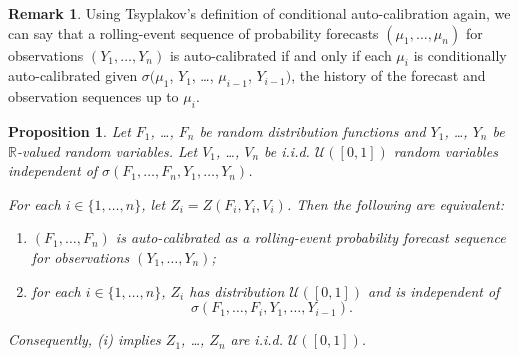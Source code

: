 \documentclass[aap]{imsart}
\theoremstyle{plain}
\newtheorem{proposition}[theorem]{Proposition}
\theoremstyle{definition}
\newtheorem*{remark}{Remark}
\begin{document}
\begin{remark}
Using Tsyplakov's definition of conditional auto-calibration again, we can say that a rolling-event sequence of probability forecasts $(\mu_1, \ldots, \mu_n)$ for observations $(Y_1, \ldots, Y_n)$ is auto-calibrated if and only if each $\mu_i$ is conditionally auto-calibrated given $\sigma(\mu_1$, $Y_1$, \ldots, $\mu_{i-1}$, $Y_{i-1})$, the history of the forecast and observation sequences up to $\mu_i$.
\end{remark}

\begin{proposition}\label{PIT_values}
  Let $F_1$, \ldots, $F_n$ be random distribution functions and $Y_1$, \ldots, $Y_n$ be $\mathbb{R}$-valued random variables. Let $V_1$, \ldots, $V_n$ be i.i.d. $\mathcal{U}([0,1])$ random variables independent of $\sigma(F_1, \ldots, F_n, Y_1, \ldots, Y_n)$.

  For each $i \in \{1, \ldots, n\}$, let $Z_i = Z(F_i, Y_i, V_i)$. Then the following are equivalent:
\begin{enumerate}[label=(\roman*)]
  \item $(F_1, \ldots, F_n)$ is auto-calibrated as a rolling-event probability forecast sequence for observations $(Y_1, \ldots, Y_n)$;
  \item for each $i \in \{1, \ldots, n\}$, $Z_i$ has distribution $\mathcal{U}([0,1])$ and is independent of 
\begin{equation*}
  \sigma(F_1, \ldots, F_i, Y_1, \ldots, Y_{i-1}).
\end{equation*}
\end{enumerate}

  Consequently, {\normalfont (i)} implies $Z_1$, \ldots, $Z_n$ are i.i.d. $\mathcal{U}([0,1])$.
\end{proposition}
\end{document}
